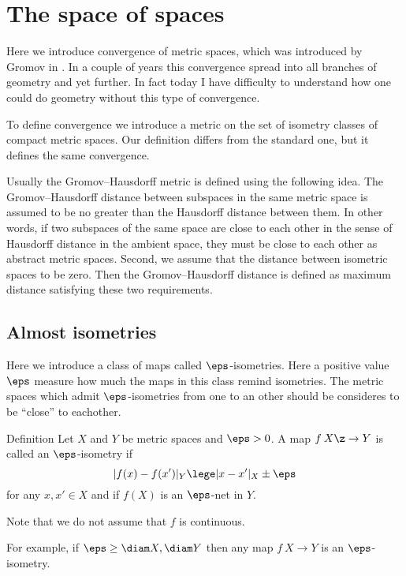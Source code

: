 \chapter{The space of spaces}\label{chap:gromov-hausdorff}

Here we introduce convergence of metric spaces,
which was introduced by Gromov in \cite{gromov-polynomial-growth}.
In a couple of years this convergence spread into all branches of geometry and yet further.
In fact today I have difficulty to understand  how one could do geometry without this type of convergence.

To define convergence we introduce a metric on the set of isometry classes of compact metric spaces.
Our definition differs from the standard one, but it defines the same convergence.

Usually the Gromov--Hausdorff metric is defined using the following idea.
The Gromov--Hausdorff distance between subspaces in
the same metric space 
is assumed to be no greater than the Hausdorff distance between
them. 
In other words, if two subspaces of the same space are close to each
other in the sense of Hausdorff distance in the ambient space, they must be
close to each other as abstract metric spaces. 
Second, we assume that
the distance between isometric spaces to be zero. 
Then the Gromov--Hausdorff distance is 
defined as maximum distance satisfying these two requirements.

\section{Almost isometries}\label{sec:alm-isom}

Here we introduce a class of maps called $\eps$-isometries.
Here a positive value $\eps$ measure how much the maps in this class remind isometries.
The metric spaces which admit $\eps$-isometries from one to an other should be consideres to be ``close'' to eachother.


\begin{thm}{Definition} Let $X$ and $Y$ be metric spaces and $\eps > 0$. 
A  map $f\: X \z\to Y$ is called an $\eps$-isometry 
if 
$$|f(x)-f(x')|_Y\lege |x-x'|_X\pm\eps$$
for any $x,x'\in X$ 
and if $f(X)$ is an $\eps$-net in $Y$.
\end{thm}

Note that we do not assume that $f$ is continuous.

For example, if $\eps\ge\diam X,\diam Y$ then any map $f\:X\to Y$ is an $\eps$-isometry.

